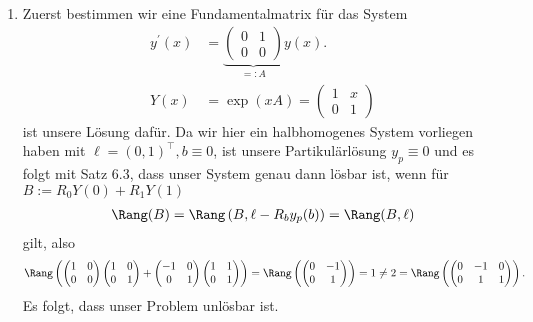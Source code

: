 \begin{solution}
\leavevmode \\
\begin{enumerate}[label = \textbf{\alph*)}]
  \item Zuerst bestimmen wir eine Fundamentalmatrix für das System
  \begin{align*}
    y^{\prime}(x) &= \underbrace{\begin{pmatrix}
      0 & 1 \\ 0 & 0
    \end{pmatrix}}_{=: A}y(x).\\
  Y(x) &= \exp(xA) = \begin{pmatrix}
    1 & x \\ 0 & 1
  \end{pmatrix}
  \end{align*}
  ist unsere Lösung dafür. Da wir hier ein halbhomogenes System vorliegen haben
  mit $\ell = (0,1)^{\top}, b \equiv 0$, ist
  unsere Partikulärlösung $y_p \equiv 0$ und es folgt mit Satz 6.3, dass unser
  System genau dann lösbar ist, wenn für $B := R_0Y(0) + R_1Y(1)$
  \begin{align*}
    \Rang(B) = \Rang\left(B,\ell - R_by_p(b)\right) = \Rang(B,\ell)
  \end{align*}
  gilt, also
  \begin{align*}
    \Rang\left(\begin{pmatrix}
      1 & 0 \\ 0 & 0
    \end{pmatrix}\begin{pmatrix}
      1 & 0 \\ 0 & 1
    \end{pmatrix} +
    \begin{pmatrix}
      -1 & 0 \\ 0 & 1
    \end{pmatrix}
    \begin{pmatrix}
      1 & 1 \\ 0 & 1
    \end{pmatrix}\right) =
    \Rang\left(\begin{pmatrix}
      0 & -1 \\ 0 & 1
    \end{pmatrix}\right) = 1 \neq 2 =
    \Rang\left(\begin{pmatrix}
      0 & -1 & 0\\ 0 & 1 & 1
    \end{pmatrix}\right).
  \end{align*}
  Es folgt, dass unser Problem unlösbar ist.

\end{enumerate}
\end{solution}
